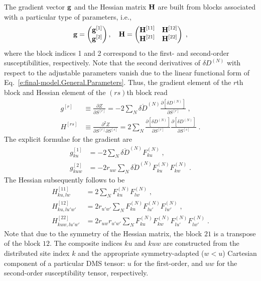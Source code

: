 \documentclass[aip,amsmath,amssymb,reprint,floatfix]{revtex4-1}
\begin{document}
The gradient vector ${\bf g}$ and the Hessian matrix ${\bf H}$ 
are built from blocks associated with a particular type of parameters, i.e.,
%
\begin{equation}\label{e:Newton.gH}
 {\bf g} = 
\begin{pmatrix}
{\bf g}^{[1]} \\ 
{\bf g}^{[2]} 
\end{pmatrix} ,\quad
 {\bf H} = 
\begin{pmatrix}
{\bf H}^{[11]} & {\bf H}^{[12]}  \\ 
{\bf H}^{[21]} & {\bf H}^{[22]}  
\end{pmatrix} \;,
\end{equation}
%
where the block indices 1 and 2 correspond to the first\hyp{} and second\hyp{}order susceptibilities, respectively.
Note that the second derivatives of $\delta D^{(N)}$ 
with respect to the adjustable parameters vanish
due to the linear functional form of Eq.~\eqref{e:final-model.General.Parameters}.
Thus, the gradient element of the $r$th block and Hessian element of the $(rs)$th block read
%
\begin{subequations}
 \begin{align}
  g^{[r ]}    &\equiv \frac{\partial   Z}{\partial S^{[r]}} 
     =-2\sum_N \overline{\delta D}^{(N)}
               \frac{\partial   \left[ \delta D^{(N)} \right]}{\partial S^{[r]}} \;,\\
  H^{[rs]} &\equiv \frac{\partial^2 Z}{\partial S^{[r]} \partial S^{[s]}}  
     = 2\sum_N 
        \frac{\partial   \left[ \delta D^{(N)} \right]}{\partial S^{[r]}}
        \frac{\partial   \left[ \delta D^{(N)} \right]}{\partial S^{[s]}} \;.
 \end{align}
\end{subequations}
%
The explicit formulae for the gradient are
%
\begin{subequations}
 \begin{align}
  g^{[1]}_{ku} &=-2\sum_N \overline{\delta D}^{(N)} F^{(N)}_{ku} \;,\\
  g^{[2]}_{kuw} &=-2r_{uw} \sum_N \overline{\delta D}^{(N)} F^{(N)}_{ku} F^{(N)}_{kw} \;.
 \end{align}
\end{subequations}
%
The Hessian subsequently follows to be
%
\begin{subequations}
 \begin{align}
  H^{[11]}_{ku,lw} &= 2\sum_N F^{(N)}_{ku} F^{(N)}_{lw} \;,\\
  H^{[12]}_{ku,lu'w'} &= 2r_{u'w'} \sum_N F^{(N)}_{ku} F^{(N)}_{lu'} F^{(N)}_{lw'}  \;,\\
  H^{[22]}_{kuw,lu'w'} &= 2r_{uw} r_{u'w'} \sum_N F^{(N)}_{ku} F^{(N)}_{kw} F^{(N)}_{lu'} F^{(N)}_{lw'} \;.
 \end{align}
\end{subequations}
%
Note that due to the symmetry of the Hessian matrix, the block $21$
is a transpose of the block $12$. 
The composite indices $ku$ and $kuw$ are constructed from the distributed site index $k$
and the appropriate symmetry\hyp{}adapted ($w<u$) Cartesian component 
of a particular DMS tensor: $u$ for the first\hyp{}order,
and $uw$ for the second\hyp{}order susceptibility tensor, respectively.


\end{document}
